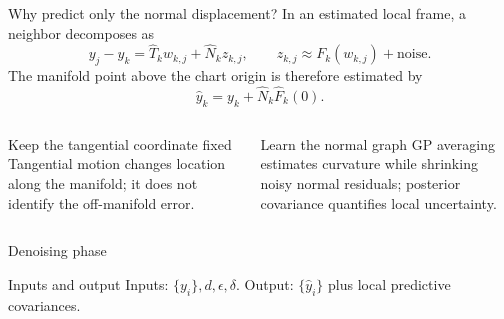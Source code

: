 \documentclass[aspectratio=169,10pt]{beamer}
\newcommand{\R}{\mathbb R}
\begin{document}
\begin{frame}{Why predict only the normal displacement?}
  In an estimated local frame, a neighbor decomposes as
  \[
    y_j-y_k
      =\widehat T_k w_{k,j}+\widehat N_k z_{k,j},
    \qquad z_{k,j}\approx F_k(w_{k,j})+\text{noise}.
  \]
  The manifold point above the chart origin is therefore estimated by
  \[
    \widehat y_k=y_k+\widehat N_k\widehat F_k(0).
  \]
  \begin{columns}[T]
      \begin{block}{Keep the tangential coordinate fixed}
        Tangential motion changes location along the manifold; it does not
        identify the off-manifold error.
      \end{block}
      \begin{exampleblock}{Learn the normal graph}
        GP averaging estimates curvature while shrinking noisy normal residuals;
        posterior covariance quantifies local uncertainty.
      \end{exampleblock}
  \end{columns}
\end{frame}

\begin{frame}{Denoising phase}
  \begin{center}
  \end{center}
  \vspace{0.25cm}
  \begin{alertblock}{Inputs and output}
    Inputs: \(\{y_i\},d,\epsilon,\delta\).\quad
    Output: \(\{\widehat y_i\}\) plus local predictive covariances.
  \end{alertblock}
\end{frame}
\end{document}
